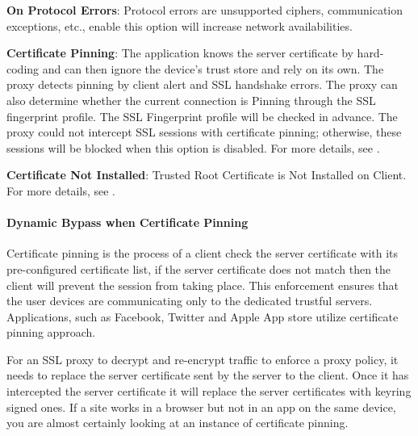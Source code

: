 \textbf{On Protocol Errors}: Protocol errors are unsupported ciphers, communication exceptions, etc., enable this option will increase network availabilities. 


\textbf{Certificate Pinning}: The application knows the server certificate by hard-coding and can then ignore the device’s trust store and rely on its own. 
The proxy detects pinning by client alert and SSL handshake errors. 
The proxy can also determine whether the current connection is Pinning through the SSL fingerprint profile. 
The SSL Fingerprint profile will be checked in advance. The proxy could not intercept SSL sessions with certificate pinning; otherwise, 
these sessions will be blocked when this option is disabled.
For more details, see \textbf{\hyperlink{link:Dynamic Bypass when Certificate Pinning}{\color{linkblue}{Dynamic Bypass when Certificate Pinning}}}.


\textbf{Certificate Not Installed}: Trusted Root Certificate is Not Installed on Client.  
For more details, see \textbf{\hyperlink{link:Dynamic Bypass when Certificate is Not Installed}{\color{linkblue}{Dynamic Bypass when Certificate is Not Installed}}}.

\hypertarget{link:Dynamic Bypass when Certificate Pinning}{\paragraph{Dynamic Bypass when Certificate Pinning}}
\label{sec:decrypt:profile:decryptionprofile:bypass:pinning}

Certificate pinning is the process of a client check the server certificate with its pre-configured certificate list, 
if the server certificate does not match then the client will prevent the session from taking place. 
This enforcement ensures that the user devices are communicating only to the dedicated trustful servers. 
Applications, such as Facebook, Twitter and Apple App store utilize certificate pinning approach.


For an SSL proxy to decrypt and re-encrypt traffic to enforce a proxy policy, it needs to replace the server certificate sent by the server to the client. 
Once it has intercepted the server certificate it will replace the server certificates with keyring signed ones. 
If a site works in a browser but not in an app on the same device, you are almost certainly looking at an instance of certificate pinning.


